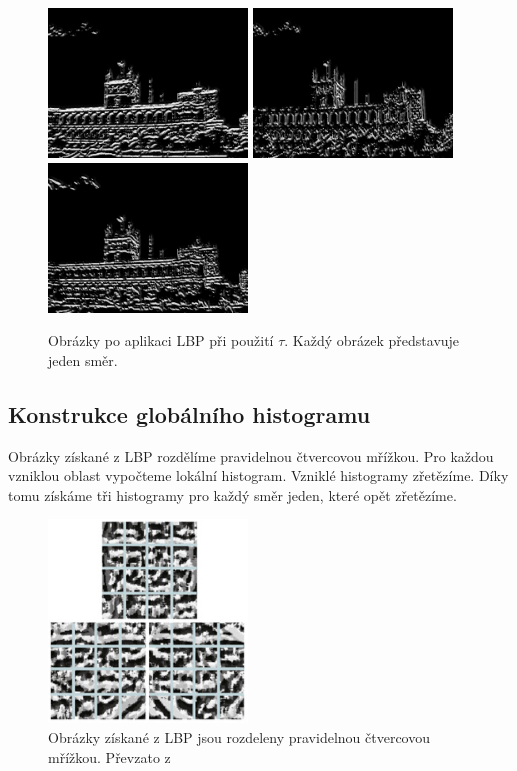 \documentclass{report}
\begin{document}
\begin{figure}[H]
	\centering
	\includegraphics[width=150pt]{./img/lbp0_tau.jpg}
	\includegraphics[width=150pt]{./img/lbp1_tau.jpg}
	\includegraphics[width=150pt]{./img/lbp2_tau.jpg}
	\caption{Obrázky po aplikaci LBP při použití $\tau$. Každý obrázek představuje jeden směr.}
\end{figure} 

\subsection{Konstrukce globálního histogramu}
Obrázky získané z LBP rozdělíme pravidelnou čtvercovou mřížkou. Pro každou vzniklou oblast vypočteme lokální histogram. Vzniklé histogramy zřetězíme. Díky tomu získáme tři histogramy pro každý směr jeden, které opět zřetězíme. 

\begin{figure}[H]
	\centering
	\includegraphics[width=150pt]{./img/vypocet_histogramu.png}
	\caption{Obrázky získané z LBP jsou rozdeleny pravidelnou čtvercovou mřížkou. Převzato z \cite{SrovnaniDeskriptoru}}
\end{figure} 
\end{document}
